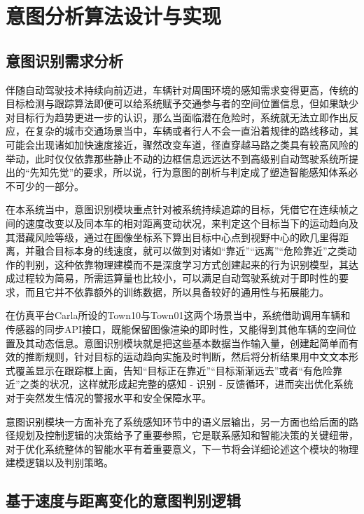 \chapter{意图分析算法设计与实现}

\section{意图识别需求分析}

伴随自动驾驶技术持续向前迈进，车辆针对周围环境的感知需求变得更高，传统的目标检测与跟踪算法即便可以给系统赋予交通参与者的空间位置信息，但如果缺少对目标行为趋势更进一步的认识，那么当面临潜在危险时，系统就无法立即作出反应，在复杂的城市交通场景当中，车辆或者行人不会一直沿着规律的路线移动，其可能会出现诸如加快速度接近，骤然改变车道，径直穿越马路之类具有较高风险的举动，此时仅仅依靠那些静止不动的边框信息远远达不到高级别自动驾驶系统所提出的“先知先觉”的要求，所以说，行为意图的剖析与判定成了塑造智能感知体系必不可少的一部分。

在本系统当中，意图识别模块重点针对被系统持续追踪的目标，凭借它在连续帧之间的速度改变以及同本车的相对距离变动状况，来判定这个目标当下的运动趋向及其潜藏风险等级，通过在图像坐标系下算出目标中心点到视野中心的欧几里得距离，并融合目标本身的线速度，就可以做到对诸如“靠近”“远离”“危险靠近”之类动作的判别，这种依靠物理建模而不是深度学习方式创建起来的行为识别模型，其达成过程较为简易，所需运算量也比较小，可以满足自动驾驶系统对于即时性的要求，而且它并不依靠额外的训练数据，所以具备较好的通用性与拓展能力。

在仿真平台Carla所设的Town10与Town01这两个场景当中，系统借助调用车辆和传感器的同步API接口，既能保留图像渲染的即时性，又能得到其他车辆的空间位置及其动态信息。意图识别模块就是把这些基本数据当作输入量，创建起简单而有效的推断规则，针对目标的运动趋向实施及时判断，然后将分析结果用中文文本形式覆盖显示在跟踪框上面，告知“目标正在靠近”“目标渐渐远去”或者“有危险靠近”之类的状况，这样就形成起完整的感知 - 识别 - 反馈循环，进而突出优化系统对于突然发生情况的警报水平和安全保障水平。

意图识别模块一方面补充了系统感知环节中的语义层输出，另一方面也给后面的路径规划及控制逻辑的决策给予了重要参照，它是联系感知和智能决策的关键纽带，对于优化系统整体的智能水平有着重要意义，下一节将会详细论述这个模块的物理建模逻辑以及判别策略。


\section{基于速度与距离变化的意图判别逻辑}

